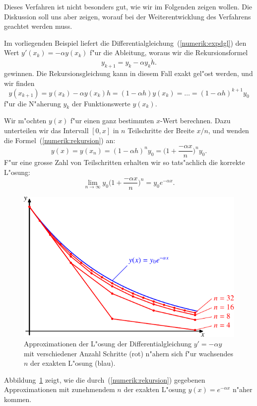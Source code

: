 Dieses Verfahren ist nicht besonders gut, wie wir im Folgenden zeigen
wollen.
Die Diskussion soll uns aber zeigen, worauf bei der Weiterentwicklung
des Verfahrens geachtet werden muss.

Im vorliegenden Beispiel liefert die
Differentialgleichung~(\ref{numerik:expdgl})
den Wert $y'(x_k)=-\alpha y(x_k)$ f"ur die Ableitung,
woraus wir die Rekursionsformel
\[
y_{k+1}=y_k - \alpha y_k \dot h.
\]
gewinnen.
Die Rekursionsgleichung kann in diesem Fall exakt gel"ost werden,
und wir finden
\begin{equation}
y(x_{k+1}) = y(x_k)-\alpha y(x_k) h=(1-\alpha h) y(x_k)=\dots
=(1-\alpha h)^{k+1}y_0
\label{numerik:rekursion}
\end{equation}
f"ur die N"aherung $y_k$ der Funktionswerte $y(x_k)$.



Wir m"ochten $y(x)$ f"ur einen ganz bestimmten $x$-Wert berechnen.
Dazu unterteilen wir das Intervall $[0,x]$ in $n$ Teilschritte der
Breite $x/n$, und wenden die Formel~(\ref{numerik:rekursion}) an:
\[
y(x)=y(x_n)=(1-\alpha h)^n y_0=\biggl(1+\frac{-\alpha x}{n}\biggr)^n y_0.
\]
F"ur eine grosse Zahl von Teilschritten erhalten wir so tats"achlich die
korrekte L"osung:
\[
\lim_{n\to\infty}y_0\biggl(1+\frac{-\alpha x}n\biggr)^n=y_0 e^{-\alpha x}.
\]
\begin{figure}
\centering
\includegraphics{chapters/images/numerik-1.pdf}
\caption{Approximationen der L"osung der Differentialgleichung $y'=-\alpha y$
mit verschiedener Anzahl Schritte (rot) n"ahern sich f"ur wachsendes
$n$ der exakten L"osung (blau).
\label{numerik:approximation}}
\end{figure}%
Abbildung~\ref{numerik:approximation} zeigt, wie die
durch~(\ref{numerik:rekursion}) gegebenen Approximationen mit zunehmendem
$n$ der exakten L"osung $y(x)=e^{-\alpha x}$ n"aher kommen.


